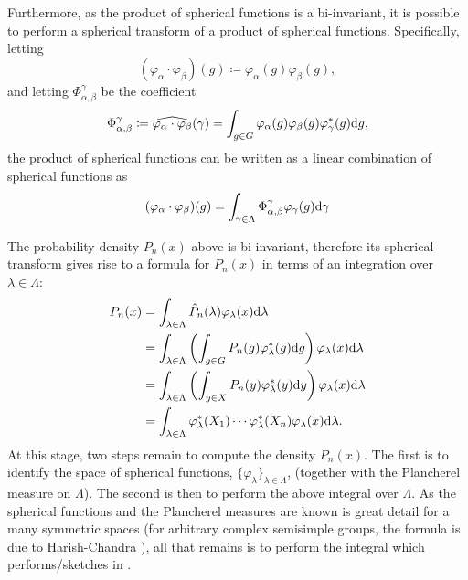 \documentclass[notitlepage]{article}
\begin{document}
Furthermore, as the product of spherical functions is a bi-invariant, it is possible to perform a spherical transform of a product of spherical functions.
Specifically, letting
\begin{equation}
    (\varphi_{\alpha} \cdot \varphi_{\beta})(g) \coloneqq \varphi_{\alpha}(g)\varphi_{\beta}(g),
\end{equation}
and letting $\Phi_{\alpha,\beta}^{\gamma}$ be the coefficient
\begin{equation}
    \Phi_{\alpha,\beta}^{\gamma} \coloneqq \widehat{\varphi_{\alpha} \cdot \varphi_{\beta}}(\gamma) = \int_{g \in G} \varphi_{\alpha}(g)\varphi_{\beta}(g)\varphi_{\gamma}^{*}(g) \mathrm{d} g,
\end{equation}
the product of spherical functions can be written as a linear combination of spherical functions as
\begin{equation}
    (\varphi_{\alpha} \cdot \varphi_{\beta})(g) = \int_{\gamma \in \Lambda} \Phi_{\alpha,\beta}^{\gamma}\varphi_{\gamma}(g) \mathrm{d} \gamma
\end{equation}

The probability density $P_n(x)$ above is bi-invariant, therefore its spherical transform gives rise to a formula for $P_n(x)$ in terms of an integration over $\lambda \in \Lambda$:
\begin{align}
    P_n(x) 
    &= \int_{\lambda \in \Lambda} \hat P_n(\lambda) \varphi_{\lambda}(x) \mathrm{d} \lambda \\
    &= \int_{\lambda \in \Lambda} \left(\int_{g \in G} P_n(g) \varphi_{\lambda}^{*}(g) \mathrm{d} g\right) \varphi_{\lambda}(x) \mathrm{d} \lambda \\
    &= \int_{\lambda \in \Lambda} \left(\int_{y \in X} P_n(y) \varphi_{\lambda}^{*}(y) \mathrm{d} y\right) \varphi_{\lambda}(x) \mathrm{d} \lambda \\
    &= \int_{\lambda \in \Lambda} \varphi^{*}_{\lambda}(X_1)\cdots\varphi^{*}_{\lambda}(X_n) \varphi_{\lambda}(x) \mathrm{d} \lambda.
\end{align}
At this stage, two steps remain to compute the density $P_n(x)$.
The first is to identify the space of spherical functions, $\{\varphi_{\lambda}\}_{\lambda \in \Lambda}$, (together with the Plancherel measure on $\Lambda$).
The second is then to perform the above integral over $\Lambda$.
As the spherical functions and the Plancherel measures are known is great detail for a many symmetric spaces (for arbitrary complex semisimple groups, the formula is due to Harish-Chandra \cite[Theorem 5.7]{helgason1984groups}), all that remains is to perform the integral which \citeauthor{klyachko2000random} performs/sketches in \cite{klyachko2000random}.
\end{document}
